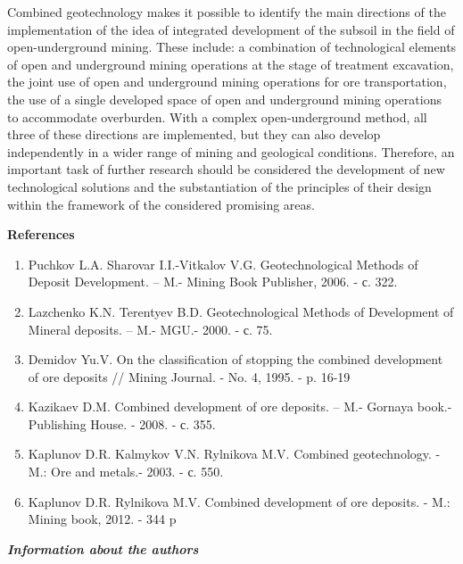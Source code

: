\begin{multicols}{2}
Combined geotechnology makes it possible to identify the main directions
of the implementation of the idea of integrated development of the
subsoil in the field of open-underground mining. These include: a
combination of technological elements of open and underground mining
operations at the stage of treatment excavation, the joint use of open
and underground mining operations for ore transportation, the use of a
single developed space of open and underground mining operations to
accommodate overburden. With a complex open-underground method, all
three of these directions are implemented, but they can also develop
independently in a wider range of mining and geological conditions.
Therefore, an important task of further research should be considered
the development of new technological solutions and the substantiation of
the principles of their design within the framework of the considered
promising areas.
\end{multicols}

\begin{center}
{\bfseries References}
\end{center}

\begin{enumerate}
\item
Puchkov L.A. Sharovar I.I.-Vitkalov V.G. Geotechnological Methods of Deposit
Development. – M.- Mining Book Publisher, 2006. - с. 322.

\item
Lazchenko K.N. Terentyev B.D. Geotechnological Methods of Development of Mineral
deposits. – M.- MGU.- 2000. - с. 75.

\item
Demidov Yu.V. On the classification of stopping the combined development of ore deposits //
Mining Journal. - No. 4, 1995. - p. 16-19

\item
Kazikaev D.M. Combined development of ore deposits. – M.- Gornaya book.- Publishing
House. - 2008. - с. 355.

\item
Kaplunov D.R. Kalmykov V.N. Rylnikova M.V. Combined geotechnology. - M.: Ore and
metals.- 2003. - с. 550.

\item
Kaplunov D.R. Rylnikova M.V. Combined development of ore deposits. - M.: Mining book,
2012. - 344 p
\end{enumerate}

\emph{{\bfseries Information about the authors}}

